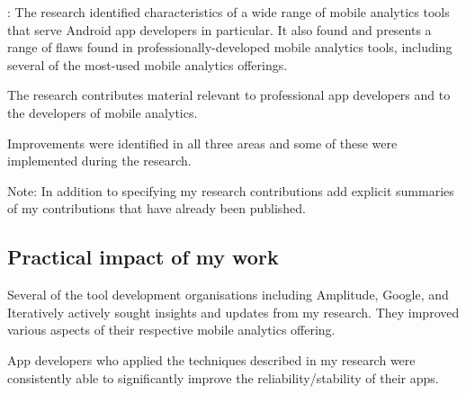 :
The research identified characteristics of a wide range of mobile analytics tools that serve Android app developers in particular. It also found and  presents a range of flaws found in professionally-developed mobile analytics tools, including several of the most-used mobile analytics offerings.

The research contributes material relevant to professional app developers and to the developers of mobile analytics. 

Improvements were identified in all three areas and some of these were implemented during the research. 

Note: In addition to specifying my research contributions add explicit summaries of my contributions that have already been published.

\subsection{Practical impact of my work}
Several of the tool development organisations including Amplitude, Google, and Iteratively actively sought insights and updates from my research. They improved various aspects of their respective mobile analytics offering.

App developers who applied the techniques described in my research were consistently able to significantly improve the reliability/stability of their apps.
